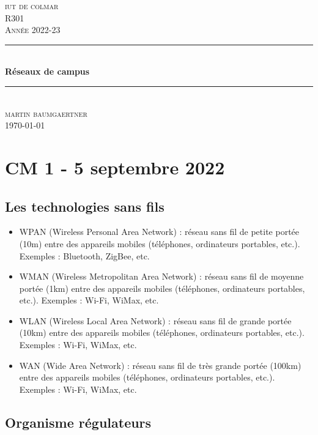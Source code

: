 \documentclass[12pt, a4paper]{article}
\begin{document}
\begin{titlepage}
	\newcommand{\HRule}{\rule{\linewidth}{0.5mm}} 
	\center 
	\textsc{\LARGE iut de colmar}\\[6.5cm] 
	\textsc{\Large R301}\\[0.5cm] 
	\textsc{\large Année 2022-23}\\[0.5cm]
	\HRule\\[0.75cm]
	{\huge\bfseries Réseaux de campus}\\[0.4cm]
	\HRule\\[1.5cm]
	\textsc{\large martin baumgaertner}\\[6.5cm] 

	\vfill\vfill\vfill
	{\large\today} 
	\vfill
\end{titlepage}
\newpage
\tableofcontents
\newpage
\section{CM 1 - 5 septembre 2022}
\subsection{Les technologies sans fils}
\begin{itemize}
    \item WPAN (Wireless Personal Area Network) : réseau sans fil de petite portée (10m) entre des appareils mobiles (téléphones, ordinateurs portables, etc.). Exemples : Bluetooth, ZigBee, etc.\\
    \item WMAN (Wireless Metropolitan Area Network) : réseau sans fil de moyenne portée (1km) entre des appareils mobiles (téléphones, ordinateurs portables, etc.). Exemples : Wi-Fi, WiMax, etc.\\
    \item WLAN (Wireless Local Area Network) : réseau sans fil de grande portée (10km) entre des appareils mobiles (téléphones, ordinateurs portables, etc.). Exemples : Wi-Fi, WiMax, etc.\\
    \item WAN (Wide Area Network) : réseau sans fil de très grande portée (100km) entre des appareils mobiles (téléphones, ordinateurs portables, etc.). Exemples : Wi-Fi, WiMax, etc.\\
\end{itemize}

\subsection{Organisme régulateurs}
\end{document}
